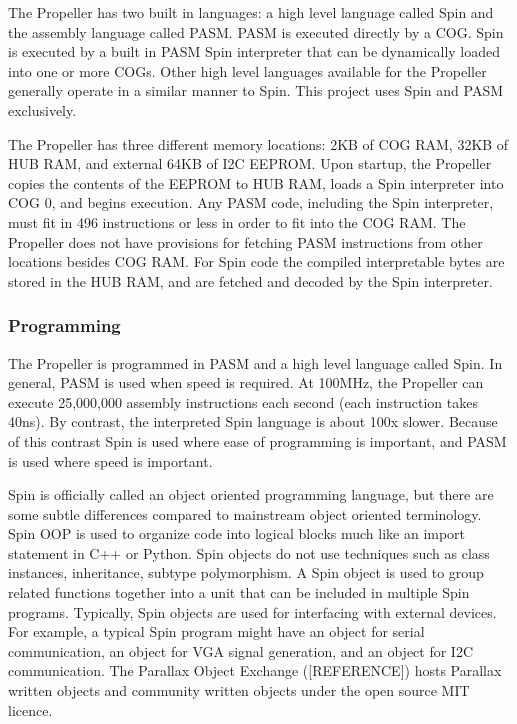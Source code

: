 \documentclass{article}
\numberwithin{equation}{section} %
\begin{document}
The Propeller has two built in languages: a high level language called Spin and the assembly language called PASM. PASM is executed directly by a COG. Spin is executed by a built in PASM Spin interpreter that can be dynamically loaded into one or more COGs. Other high level languages available for the Propeller generally operate in a similar manner to Spin. This project uses Spin and PASM exclusively.

The Propeller has three different memory locations: 2KB of COG RAM, 32KB of HUB RAM, and external 64KB of I2C EEPROM. Upon startup, the Propeller copies the contents of the EEPROM to HUB RAM, loads a Spin interpreter into COG 0, and begins execution.  Any PASM code, including the Spin interpreter, must fit in 496 instructions or less in order to fit into the COG RAM. The Propeller does not have provisions for fetching PASM instructions from other locations besides COG RAM. For Spin code the compiled interpretable bytes are stored in the HUB RAM, and are fetched and decoded by the Spin interpreter.

\subsubsection{Programming}

The Propeller is programmed in PASM and a high level language called Spin. In general, PASM is used when speed is required. At 100MHz, the Propeller can execute 25,000,000 assembly instructions each second (each instruction takes 40ns). By contrast, the interpreted Spin language is about 100x slower. Because of this contrast Spin is used where ease of programming is important, and PASM is used where speed is important.

Spin is officially called an object oriented programming language, but there are some subtle differences compared to mainstream object oriented terminology. Spin OOP is used to organize code into logical blocks much like an import statement in C++ or Python. Spin objects do not use techniques such as class instances, inheritance, subtype polymorphism. A Spin object is used to group related functions together into a unit that can be included in multiple Spin programs. Typically, Spin objects are used for interfacing with external devices. For example, a typical Spin program might have an object for serial communication, an object for VGA signal generation, and an object for I2C communication. The Parallax Object Exchange ([REFERENCE]) hosts Parallax written objects and community written objects under the open source MIT licence.
\end{document}
